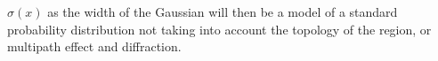 \documentclass[a4paper,12pt]{article}
\begin{document}
                                                                                                                                                                                                                                                                                                                                                                                                                                                                                                                                                                                                                                                                                                                                                                                                                                                                                                                                                                                                                                                                                                                                                                                                                                                                                                                                                                                                                                                                                                                                                                                                                                                                                                                                                                                                                                                                                                                                                                                                                                                                                                                                                                                                                       $\sigma(x)$ as the width of the Gaussian will then be a model of a standard probability distribution not taking into account the topology of the region, or multipath effect and diffraction.
\end{document}
